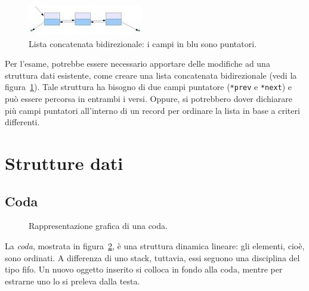 \begin{figure}
	\centering
\includegraphics[width=0.45\columnwidth]{immagini/lista_bidirezionale}
	\caption[Lista concatenata bidirezionale]{Lista concatenata bidirezionale: i campi in blu sono puntatori.}
	\label{fig:blist}
\end{figure}
Per l'esame, potrebbe essere necessario apportare delle modifiche ad una struttura dati esistente, come creare una lista concatenata bidirezionale (vedi la figura~\ref{fig:blist}).
Tale struttura ha bisogno di due campi puntatore (\lstinline!*prev! e \lstinline!*next!) e può essere percorsa in entrambi i versi.
Oppure, si potrebbero dover dichiarare più campi puntatori all'interno di un record per ordinare la lista in base a criteri differenti.

	\section{Strutture dati}

		\subsection{Coda}
		\label{subsec:coda}

\begin{figure}
	\centering

	\caption[Coda]{Rappresentazione grafica di una coda.}
	\label{fig:coda}
\end{figure}
La \emph{coda}, mostrata in figura~\ref{fig:coda}, è una struttura dinamica lineare: gli elementi, cioè, sono ordinati.
A differenza di uno stack, tuttavia, essi seguono una disciplina del tipo \ac{fifo}.
Un nuovo oggetto inserito si colloca in fondo alla coda, mentre per estrarne uno lo si preleva dalla testa.

